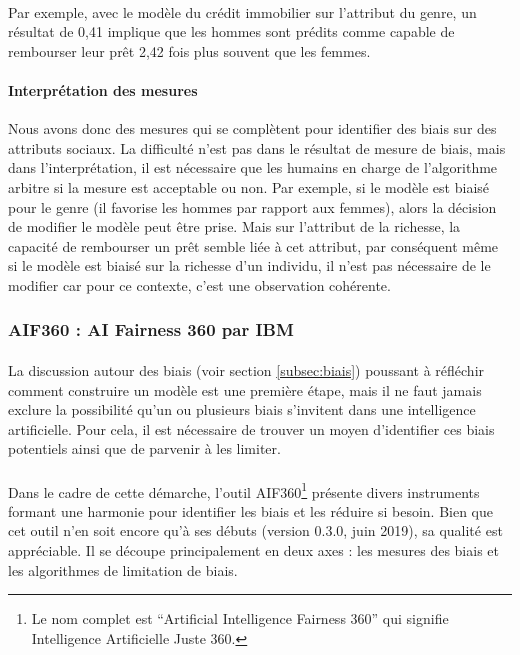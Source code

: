 \documentclass[10pt, french, a4paper]{report}
\begin{document}
\paragraph{}
Par exemple, avec le modèle du crédit immobilier sur l'attribut du genre, un résultat de 0,41 implique que les hommes sont prédits comme capable de rembourser leur prêt 2,42 fois plus souvent que les femmes.

\paragraph{Interprétation des mesures} Nous avons donc des mesures qui se complètent pour identifier des biais sur des attributs sociaux. La difficulté n'est pas dans le résultat de mesure de biais, mais dans l'interprétation, il est nécessaire que les humains en charge de l'algorithme arbitre si la mesure est acceptable ou non. Par exemple, si le modèle est biaisé pour le genre (il favorise les hommes par rapport aux femmes), alors la décision de modifier le modèle peut être prise. Mais sur l'attribut de la richesse, la capacité de rembourser un prêt semble liée à cet attribut, par conséquent même si le modèle est biaisé sur la richesse d'un individu, il n'est pas nécessaire de le modifier car pour ce contexte, c'est une observation cohérente.

\subsubsection{AIF360 : AI Fairness 360 par IBM}

\paragraph{}
La discussion autour des biais (voir section \ref{subsec:biais}) poussant à réfléchir comment construire un modèle est une première étape, mais il ne faut jamais exclure la possibilité qu’un ou plusieurs biais s’invitent dans une intelligence artificielle. Pour cela, il est nécessaire de trouver un moyen d’identifier ces biais potentiels ainsi que de parvenir à les limiter.

\paragraph{}
Dans le cadre de cette démarche, l’outil AIF360\footnote{Le nom complet est ``Artificial Intelligence Fairness 360'' qui signifie Intelligence Artificielle Juste 360.} \citep{bellamy_ai_2018} présente divers instruments formant une harmonie pour identifier les biais et les réduire si besoin. Bien que cet outil n’en soit encore qu’à ses débuts (version 0.3.0, juin 2019), sa qualité est appréciable. Il se découpe principalement en deux axes : les mesures des biais et les algorithmes de limitation de biais.
\end{document}
